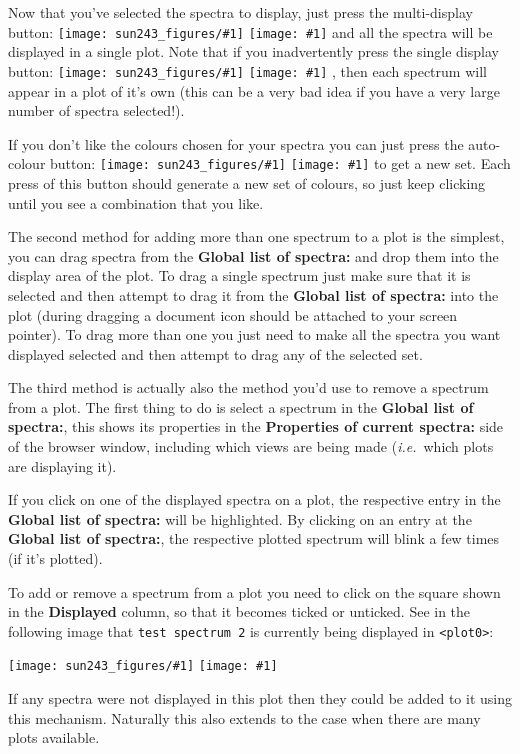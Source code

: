 \documentclass[twoside,11pt,nolof]{starlink}
\providecommand{\mainfigure}[1]
{\begin{center}
    \ifpdf
    \texttt{[image: sun243\_figures/\#1]}
    \else
    \texttt{[image: \#1]}
    \fi
 \end{center}
}
\providecommand{\inline}[1]
        {\ifpdf
          \texttt{[image: sun243\_figures/\#1]}
          \else
          \texttt{[image: \#1]}
          \fi
        }
\newcommand{\labelitem}[1]{\textbf{#1}}
\providecommand{\hitext}[1]{\texttt{#1}}
\providecommand{\ie}{\textit{i.e.}}
\begin{document}
Now that you've selected the spectra to display, just press the
multi-display button: \inline{multidisplay} and all the spectra
will be displayed in a single plot. Note that if you inadvertently
press the single display button: \inline{display}, then each
spectrum will appear in a plot of it's own (this can be a very bad
idea if you have a very large number of spectra selected!).

If you don't like the colours chosen for your spectra you can just press the
auto-colour button: \inline{rainbow} to get a new set. Each press of this
button should generate a new set of colours, so just keep clicking until you
see a combination that you like.

The second method for adding more than one spectrum to a plot is the
simplest, you can drag spectra from the \labelitem{Global list of
spectra:} and drop them into the display area of the plot. To drag a
single spectrum just make sure that it is selected and then attempt to
drag it from the \labelitem{Global list of spectra:} into the plot
(during dragging a document icon should be attached to your screen
pointer). To drag more than one you just need to make all the spectra
you want displayed selected and then attempt to drag any of the
selected set.

The third method is actually also the method you'd use to remove a
spectrum from a plot. The first thing to do is select a spectrum in the
\labelitem{Global list of spectra:},
this shows its properties in the
\labelitem{Properties of current spectra:}
side of the browser window, including which views
are being made (\ie\ which plots are displaying it). 

If you click on one of the displayed
spectra on a plot, the respective entry in the \labelitem{Global list of
spectra:} will be highlighted. By clicking on 
an entry at the \labelitem{Global list of
spectra:}, the respective plotted spectrum will
blink a few times (if it's plotted). 

To add or remove
a spectrum from a plot you need to click on the square shown in the
\labelitem{Displayed} column, so that it becomes ticked or unticked. See
in the following image that \hitext{test spectrum 2} is currently
being displayed in \hitext{<plot0>}:

\mainfigure{browser4}

If any spectra were not displayed in this plot then they could be
added to it using this mechanism. Naturally this also extends to the
case when there are many plots available.
\end{document}
